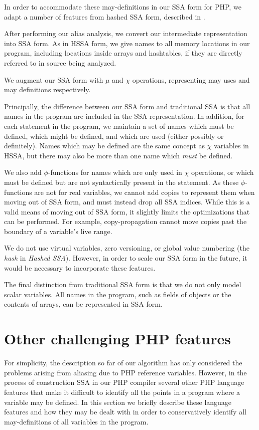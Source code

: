 In order to accommodate these may-definitions in our SSA form for PHP,
we adapt a number of features from hashed SSA form, described in
.

After performing our alias analysis, we convert our intermediate
representation into SSA form. As in HSSA form, we give names to all
memory locations in our program, including locations inside arrays and
hashtables, if they are directly referred to in source being analyzed.

We augment our SSA form with $\mu$ and $\chi$ operations, representing
may uses and may definitions respectively.

Principally, the difference between our SSA form and traditional SSA is
that all names in the program are included in the SSA representation.
In addition, for each statement in the program, we maintain a set of
names which must be defined, which might be defined, and which are used
(either possibly or definitely).  Names which may be defined are the
same concept as $\chi$ variables in HSSA, but there may also be more
than one name which \emph{must} be defined.

We also add $\phi$-functions for names which are only used in $\chi$
operations, or which must be defined but are not syntactically present
in the statement.  As these $\phi$-functions are not for real variables,
we cannot add copies to represent them when moving out of SSA form, and
must instead drop all SSA indices.  While this is a valid means of
moving out of SSA form, it slightly limits the optimizations that can be
performed.  For example, copy-propagation cannot move copies past the
boundary of a variable's live range.

We do not use virtual variables, zero versioning, or global value
numbering (the \emph{hash} in \emph{Hashed SSA}).  However, in
order to scale our SSA form in the future, it would be necessary to
incorporate these features.

The final distinction from traditional SSA form is that we do not only
model scalar variables.  All names in the program, such as fields of
objects or the contents of arrays, can be represented in SSA form.


\section{Other challenging PHP features}
\label{other-difficult-features}

For simplicity, the description so far of our algorithm has only
considered the problems arising from aliasing due to PHP reference
variables. However, in the process of construction SSA in our PHP
compiler several other PHP language features that make it difficult to
identify all the points in a program where a variable may be
defined. In this section we briefly describe these language features
and how they may be dealt with in order to conservatively identify all
may-definitions of all variables in the program.

